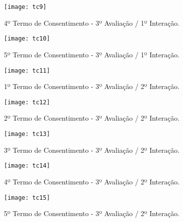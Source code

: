 	\newpage
	\begin{figure}[h]
		\centering
		\texttt{[image: tc9]}
		\caption[4º Termo de Consentimento - 3º Avaliação / 1º Interação]{4º Termo de Consentimento - 3º Avaliação / 1º Interação.}
		\label{fig:tc1}
	\end{figure}

	\newpage
	\begin{figure}[h]
		\centering
		\texttt{[image: tc10]}
		\caption[5º Termo de Consentimento - 3º Avaliação / 1º Interação]{5º Termo de Consentimento - 3º Avaliação / 1º Interação.}
		\label{fig:tc1}
	\end{figure}

	\newpage
	\begin{figure}[h]
		\centering
		\texttt{[image: tc11]}
		\caption[1º Termo de Consentimento - 3º Avaliação / 2º Interação]{1º Termo de Consentimento - 3º Avaliação / 2º Interação.}
		\label{fig:tc1}
	\end{figure}

	\newpage
	\begin{figure}[h]
		\centering
		\texttt{[image: tc12]}
		\caption[2º Termo de Consentimento - 3º Avaliação / 2º Interação]{2º Termo de Consentimento - 3º Avaliação / 2º Interação.}
		\label{fig:tc1}
	\end{figure}

	\newpage
	\begin{figure}[h]
		\centering
		\texttt{[image: tc13]}
		\caption[3º Termo de Consentimento - 3º Avaliação / 2º Interação]{3º Termo de Consentimento - 3º Avaliação / 2º Interação.}
		\label{fig:tc1}
	\end{figure}

	\newpage
	\begin{figure}[h]
		\centering
		\texttt{[image: tc14]}
		\caption[4º Termo de Consentimento - 3º Avaliação / 2º Interação]{4º Termo de Consentimento - 3º Avaliação / 2º Interação.}
		\label{fig:tc1}
	\end{figure}

	\newpage
	\begin{figure}[h]
		\centering
		\texttt{[image: tc15]}
		\caption[5º Termo de Consentimento - 3º Avaliação / 2º Interação]{5º Termo de Consentimento - 3º Avaliação / 2º Interação.}
		\label{fig:tc1}
	\end{figure}
	